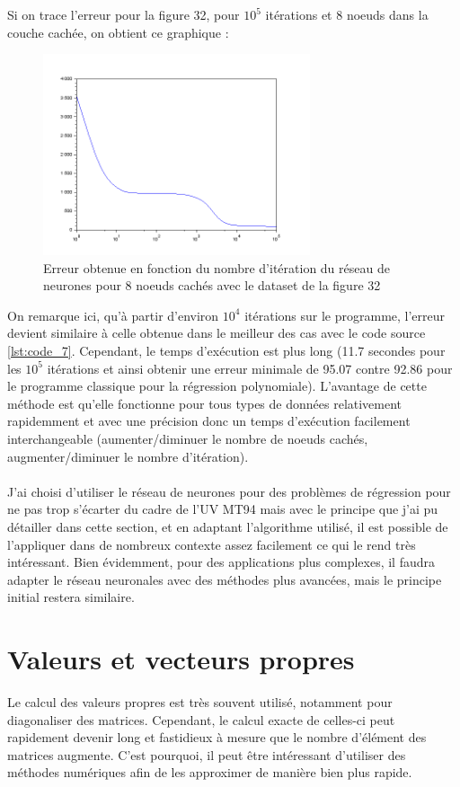     Si on trace l'erreur pour la figure 32, pour $10^5$ itérations et 8 noeuds dans la couche cachée, on obtient ce graphique : 
    \begin{figure}[H]
              \centering
                \includegraphics[width=0.7\textwidth]{images/rdn_poly_err.png}
              \caption{Erreur obtenue en fonction du nombre d'itération du réseau de neurones pour 8 noeuds cachés avec le dataset de la figure 32}
              \label{fig:rn2}
            \end{figure}
        On remarque ici, qu'à partir d'environ $10^4$ itérations sur le programme, l'erreur devient similaire à celle obtenue dans le meilleur des cas avec le code source \ref{lst:code_7}. Cependant, le temps d'exécution est plus long (11.7 secondes pour les $10^5$ itérations et ainsi obtenir une erreur minimale de 95.07 contre 92.86 pour le programme classique pour la régression polynomiale). L'avantage de cette méthode est qu'elle fonctionne pour tous types de données relativement rapidemment et avec une précision donc un temps d'exécution facilement interchangeable (aumenter/diminuer le nombre de noeuds cachés, augmenter/diminuer le nombre d'itération).\\\\
        J'ai choisi d'utiliser le réseau de neurones pour des problèmes de régression pour ne pas trop s'écarter du cadre de l'UV MT94 mais avec le principe que j'ai pu détailler dans cette section, et en adaptant l'algorithme utilisé, il est possible de l'appliquer dans de nombreux contexte assez facilement ce qui le rend très intéressant. Bien évidemment, pour des applications plus complexes, il faudra adapter le réseau neuronales avec des méthodes plus avancées, mais le principe initial restera similaire.
        \newpage
   \section*{Valeurs et vecteurs propres}
   Le calcul des valeurs propres est très souvent utilisé, notamment pour diagonaliser des matrices. Cependant, le calcul exacte de celles-ci peut rapidement devenir long et fastidieux à mesure que le nombre d'élément des matrices augmente. C'est pourquoi, il peut être intéressant d'utiliser des méthodes numériques afin de les approximer de manière bien plus rapide.
